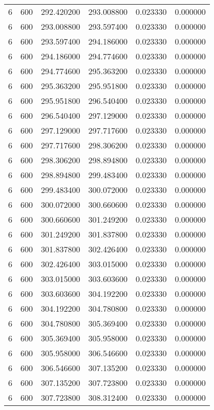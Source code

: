 \begin{longtable}{rrrrrr}
6 & 600 & 292.420200 & 293.008800 & 0.023330 & 0.000000 \\
6 & 600 & 293.008800 & 293.597400 & 0.023330 & 0.000000 \\
6 & 600 & 293.597400 & 294.186000 & 0.023330 & 0.000000 \\
6 & 600 & 294.186000 & 294.774600 & 0.023330 & 0.000000 \\
6 & 600 & 294.774600 & 295.363200 & 0.023330 & 0.000000 \\
6 & 600 & 295.363200 & 295.951800 & 0.023330 & 0.000000 \\
6 & 600 & 295.951800 & 296.540400 & 0.023330 & 0.000000 \\
6 & 600 & 296.540400 & 297.129000 & 0.023330 & 0.000000 \\
6 & 600 & 297.129000 & 297.717600 & 0.023330 & 0.000000 \\
6 & 600 & 297.717600 & 298.306200 & 0.023330 & 0.000000 \\
6 & 600 & 298.306200 & 298.894800 & 0.023330 & 0.000000 \\
6 & 600 & 298.894800 & 299.483400 & 0.023330 & 0.000000 \\
6 & 600 & 299.483400 & 300.072000 & 0.023330 & 0.000000 \\
6 & 600 & 300.072000 & 300.660600 & 0.023330 & 0.000000 \\
6 & 600 & 300.660600 & 301.249200 & 0.023330 & 0.000000 \\
6 & 600 & 301.249200 & 301.837800 & 0.023330 & 0.000000 \\
6 & 600 & 301.837800 & 302.426400 & 0.023330 & 0.000000 \\
6 & 600 & 302.426400 & 303.015000 & 0.023330 & 0.000000 \\
6 & 600 & 303.015000 & 303.603600 & 0.023330 & 0.000000 \\
6 & 600 & 303.603600 & 304.192200 & 0.023330 & 0.000000 \\
6 & 600 & 304.192200 & 304.780800 & 0.023330 & 0.000000 \\
6 & 600 & 304.780800 & 305.369400 & 0.023330 & 0.000000 \\
6 & 600 & 305.369400 & 305.958000 & 0.023330 & 0.000000 \\
6 & 600 & 305.958000 & 306.546600 & 0.023330 & 0.000000 \\
6 & 600 & 306.546600 & 307.135200 & 0.023330 & 0.000000 \\
6 & 600 & 307.135200 & 307.723800 & 0.023330 & 0.000000 \\
6 & 600 & 307.723800 & 308.312400 & 0.023330 & 0.000000 \\

\end{longtable}

